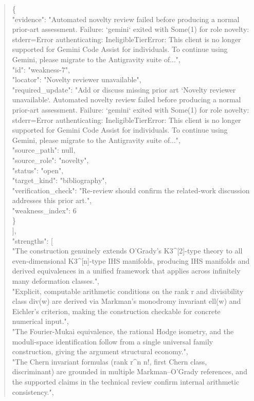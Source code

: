 \documentclass[11pt]{article}
\begin{document}
\begin{quote}
    \{\\
      "evidence": "Automated novelty review failed before producing a normal prior-art assessment. Failure: `gemini` exited with Some(1) for role novelty: stderr=Error authenticating: IneligibleTierError: This client is no longer supported for Gemini Code Assist for individuals. To continue using Gemini, please migrate to the Antigravity suite of...",\\
      "id": "weakness-7",\\
      "locator": "Novelty reviewer unavailable",\\
      "required\_update": "Add or discuss missing prior art `Novelty reviewer unavailable`. Automated novelty review failed before producing a normal prior-art assessment. Failure: `gemini` exited with Some(1) for role novelty: stderr=Error authenticating: IneligibleTierError: This client is no longer supported for Gemini Code Assist for individuals. To continue using Gemini, please migrate to the Antigravity suite of...",\\
      "source\_path": null,\\
      "source\_role": "novelty",\\
      "status": "open",\\
      "target\_kind": "bibliography",\\
      "verification\_check": "Re-review should confirm the related-work discussion addresses this prior art.",\\
      "weakness\_index": 6\\
    \}\\
  ],\\
  "strengths": [\\
    "The construction genuinely extends O'Grady's K3\^{}[2]-type theory to all even-dimensional K3\^{}[n]-type IHS manifolds, producing IHS manifolds and derived equivalences in a unified framework that applies across infinitely many deformation classes.",\\
    "Explicit, computable arithmetic conditions on the rank r and divisibility class div(w) are derived via Markman's monodromy invariant ell(w) and Eichler's criterion, making the construction checkable for concrete numerical input.",\\
    "The Fourier-Mukai equivalence, the rational Hodge isometry, and the moduli-space identification follow from a single universal family construction, giving the argument structural economy.",\\
    "The Chern invariant formulas (rank r\^{}n n!, first Chern class, discriminant) are grounded in multiple Markman--O'Grady references, and the supported claims in the technical review confirm internal arithmetic consistency.",\\

\end{quote}
\end{document}
